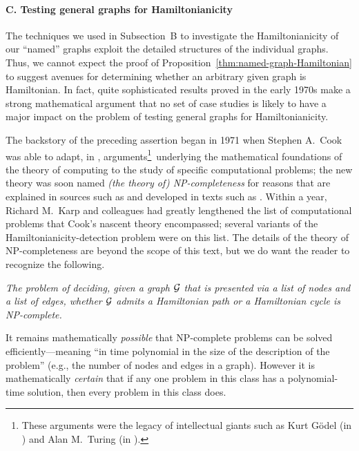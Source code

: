 \paragraph{\small\sf C. Testing general graphs for Hamiltonianicity}

The techniques we used in Subsection~{\small\sf B} to investigate the
Hamiltonianicity of our ``named'' graphs exploit the detailed
structures of the individual graphs.  Thus, we cannot expect the proof
of Proposition~\ref{thm:named-graph-Hamiltonian} to suggest avenues
for determining whether an arbitrary given graph is Hamiltonian.  In
fact, quite sophisticated results proved in the early 1970s make a
strong mathematical argument that no set of case studies is likely to
have a major impact on the problem of testing general graphs for
Hamiltonianicity.

The backstory of the preceding assertion began in 1971 when Stephen
A.~Cook  was able to adapt, in \cite{Cook71},
arguments\footnote{These arguments were the legacy of intellectual
  giants such as Kurt G\"{o}del  (in
  \cite{Goedel31}) and Alan M.~Turing  (in
  \cite{Turing36}).}~underlying the mathematical foundations of the
theory of computing to the study of specific computational problems;
the new theory was soon named {\it (the theory of) {\sf
    NP}-completeness}  for reasons that
are explained in sources such as  and developed in
texts such as .  Within a year, Richard M.~Karp
 and colleagues had greatly lengthened the
list of computational problems that Cook's nascent theory encompassed;
several variants of the Hamiltonianicity-detection problem were on
this list.  The details of the theory of {\sf NP}-completeness are
beyond the scope of this text, but we do want the reader to recognize
the following.
\begin{description}
\item
{\it The problem of deciding, given a graph $\mbox{$\cal G$}$ that is presented via
  a list of nodes and a list of edges, whether $\mbox{$\cal G$}$ admits a
  Hamiltonian path or a Hamiltonian cycle is {\sf NP}-complete.}
\end{description}
It remains mathematically {\em possible} that {\sf NP}-complete
problems can be solved efficiently---meaning ``in time polynomial in
the size of the description of the problem'' (e.g., the number of
nodes and edges in a graph).  However it is mathematically {\em
  certain} that if any one problem in this class has a polynomial-time
solution, then every problem in this class does.

